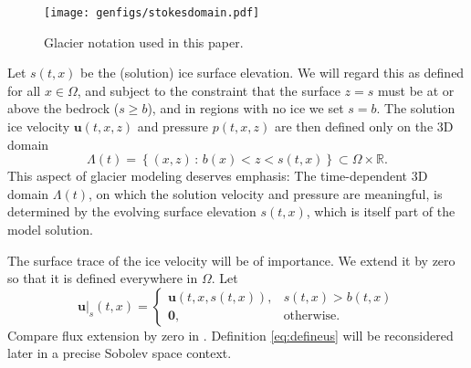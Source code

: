 \documentclass[hidelinks,onefignum,onetabnum,final]{siamart220329}  %
\newcommand{\RR}{\mathbb{R}}
\newcommand{\bu}{\mathbf{u}}
\newcommand{\bzero}{\bm{0}}
\begin{document}
\begin{figure}[ht]
\centering
\texttt{[image: genfigs/stokesdomain.pdf]}
\caption{Glacier notation used in this paper.}
\label{fig:stokesdomain}
\end{figure}

Let $s(t,x)$ be the (solution) ice surface elevation.  We will regard this as defined for all $x\in\Omega$, and subject to the constraint that the surface $z=s$ must be at or above the bedrock ($s \ge b$), and in regions with no ice we set $s=b$.  The solution ice velocity $\bu(t,x,z)$ and pressure $p(t,x,z)$ are then defined only on the 3D domain
\begin{equation}
\Lambda(t) = \left\{(x,z)\,:\,b(x) < z < s(t,x)\right\} \subset \Omega \times \RR. \label{eq:icydomain}
\end{equation}
This aspect of glacier modeling deserves emphasis:  The time-dependent 3D domain $\Lambda(t)$, on which the solution velocity and pressure are meaningful, is determined by the evolving surface elevation $s(t,x)$, which is itself part of the model solution.

The surface trace of the ice velocity will be of importance.  We extend it by zero so that it is defined everywhere in $\Omega$.  Let
\begin{equation}
\bu|_s(t,x) = \begin{cases} \bu(t,x,s(t,x)), & s(t,x)>b(t,x) \\
                            \bzero, & \text{otherwise} .\end{cases} \label{eq:defineus}
\end{equation}
Compare flux extension by zero in \cite{SchoofHewitt2013}.  Definition \eqref{eq:defineus} will be reconsidered later in a precise Sobolev space context.
\end{document}
